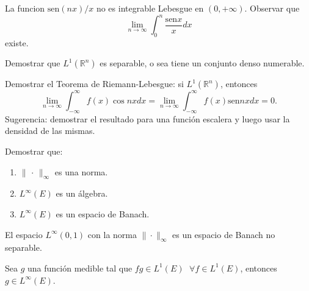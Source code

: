 \documentclass{book}
\newcommand{\rr}{\mathbb{R}}
\begin{document}
 \begin{ejer}{}
La funcion $\text{sen} (nx)/x$ no es integrable Lebesgue en $(0, +\infty)$. Observar que  \[\lim_{n\to\infty} \int_0 ^n\frac{\text{sen} x}{x} dx \]
 existe.
\end{ejer} 

\begin{ejer}{}
 Demostrar que $L^1(\rr^n)$ es separable, o sea tiene un conjunto denso numerable.
\end{ejer}

\begin{ejer}{}
 Demostrar el Teorema de Riemann-Lebesgue: si  $L^1(\rr^n)$, entonces
 $$\lim_{n\to\infty}\int_{-\infty}^{\infty} f(x) \cos nx dx = \lim_{n\to\infty}\int_{-\infty}^{\infty} f(x) \text{sen} nx dx=0.$$
Sugerencia: demostrar el resultado para una función escalera y luego usar la densidad de las mismas. 
\end{ejer}




\begin{ejer}{} Demostrar que:
	\begin{enumerate}
\item $\|\, \cdot\,\|_{\infty}$ es una norma.
\item $L^{\infty}(E)$ es un álgebra.
\item $L^{\infty}(E)$ es un espacio de Banach.  
	\end{enumerate}
	\end{ejer}


\begin{ejer}{} El espacio $L^\infty(0, 1)$ con la norma $\|\cdot \|_\infty$ es un espacio de Banach no separable.
\end{ejer}




\begin{ejer}{} Sea $g$ una función medible tal que $fg\in L^1(E)$ $\;\forall f \in L^1(E)$, entonces $g \in L^{\infty}(E)$.
\end{ejer}
\end{document}

